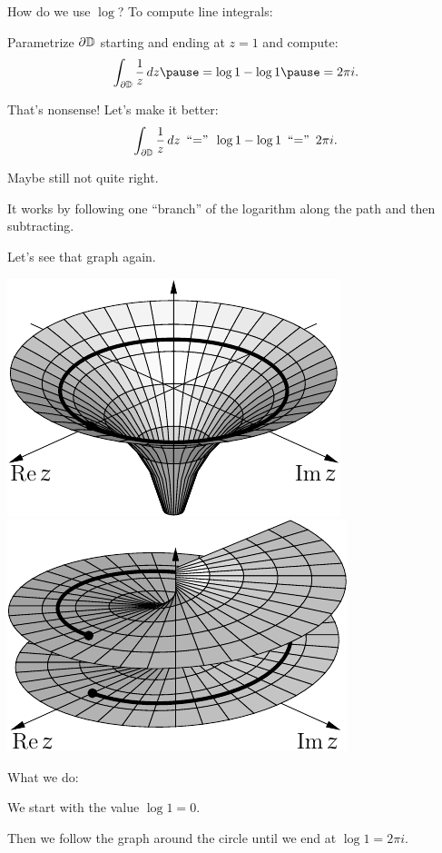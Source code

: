 \documentclass[10pt,aspectratio=169]{beamer}
\begin{document}
\begin{frame}
How do we use $\log$?  To compute line integrals:

\medskip
\pause

Parametrize $\partial {\mathbb{D}}$ starting and ending at $z=1$ and compute:
\[
\int_{\partial \D} \frac{1}{z} \, dz
\pause
= \log 1 - \log 1
\pause
= 2\pi i.
\]

\pause
That's nonsense!  Let's make it better:
\pause
\[
\int_{\partial {\mathbb{D}}} \frac{1}{z} \, dz
\enspace
\text{``$=$''}
\enspace
\log 1 - \log 1
\enspace
\text{``$=$''}
\enspace
2\pi i.
\]

\pause

Maybe still not quite right.

\medskip
\pause

It works by following one ``branch'' of the logarithm along the path
and then subtracting.

\medskip
\pause

Let's see that graph again.
\end{frame}

\begin{frame}
\includegraphics{../figures/logrealgraph}
\qquad
\includegraphics{../figures/arggraph2}

\pause
\medskip

What we do:

\medskip
\pause

We start with the value $\log 1 = 0$.

\medskip
\pause

Then we follow the graph around the circle until we end at
$\log 1 = 2\pi i$.
\end{frame}
\end{document}
